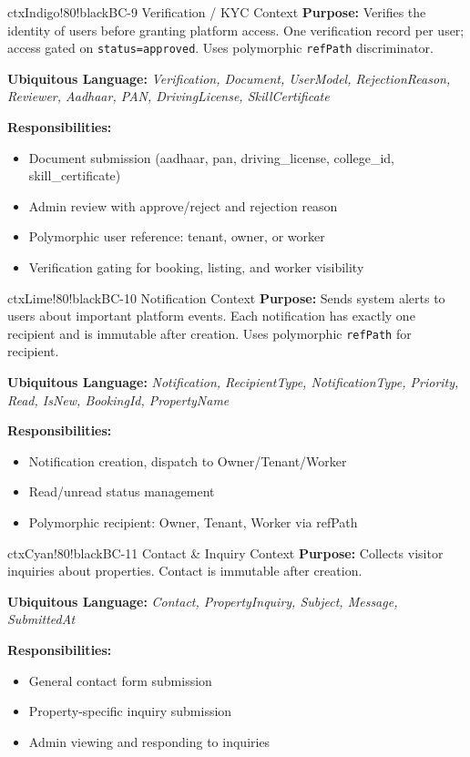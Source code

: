 \documentclass[12pt,a4paper]{article}
\begin{document}
\begin{contextbox}{ctxIndigo!80!black}{BC-9 \quad Verification / KYC Context}
\textbf{Purpose:} Verifies the identity of users before granting platform access. One verification record per user; access gated on \texttt{status=approved}. Uses polymorphic \texttt{refPath} discriminator.

\textbf{Ubiquitous Language:} \textit{Verification, Document, UserModel, RejectionReason, Reviewer, Aadhaar, PAN, DrivingLicense, SkillCertificate}

\textbf{Responsibilities:}
\begin{itemize}
  \item Document submission (aadhaar, pan, driving\_license, college\_id, skill\_certificate)
  \item Admin review with approve/reject and rejection reason
  \item Polymorphic user reference: tenant, owner, or worker
  \item Verification gating for booking, listing, and worker visibility
\end{itemize}
\end{contextbox}

\vspace{0.5em}

\begin{contextbox}{ctxLime!80!black}{BC-10 \quad Notification Context}
\textbf{Purpose:} Sends system alerts to users about important platform events. Each notification has exactly one recipient and is immutable after creation. Uses polymorphic \texttt{refPath} for recipient.

\textbf{Ubiquitous Language:} \textit{Notification, RecipientType, NotificationType, Priority, Read, IsNew, BookingId, PropertyName}

\textbf{Responsibilities:}
\begin{itemize}
  \item Notification creation, dispatch to Owner/Tenant/Worker
  \item Read/unread status management
  \item Polymorphic recipient: Owner, Tenant, Worker via refPath
\end{itemize}
\end{contextbox}

\vspace{0.5em}

\begin{contextbox}{ctxCyan!80!black}{BC-11 \quad Contact \& Inquiry Context}
\textbf{Purpose:} Collects visitor inquiries about properties. Contact is immutable after creation.

\textbf{Ubiquitous Language:} \textit{Contact, PropertyInquiry, Subject, Message, SubmittedAt}

\textbf{Responsibilities:}
\begin{itemize}
  \item General contact form submission
  \item Property-specific inquiry submission
  \item Admin viewing and responding to inquiries
\end{itemize}
\end{contextbox}
\end{document}
